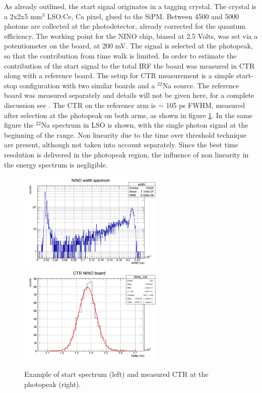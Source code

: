 As already outlined, the start signal originates in a tagging crystal.
The crystal is a 2x2x5 mm$^{3}$ LSO:Ce, Ca pixel, glued to the SiPM. Between 4500 and 5000 photons are collected at the photodetector, already corrected for the quantum efficiency. 
The working point for the NINO chip, biased at 2.5 Volts, was set via a potentiometer on the board, at 200 mV.
The signal is selected at the photopeak, so that the contribution from time walk is limited.
In order to estimate the contribution of the start signal to the total IRF the board was measured in CTR along with a reference board.
The setup for CTR measurement is a simple start-stop configuration with two similar boards and a $^{22}$Na source.
The reference board was measured separately and details will not be given here, for a complete discussion see \cite{Gundacker2014}. The CTR on the reference arm is $\sim$ 105 ps FWHM, measured after selection at the photopeak on both arms, as shown in figure \ref{fig:start}.
In the same figure the $^{22}$Na spectrum in LSO is shown, with the single photon signal at the beginning of the range. Non linearity due to the time over threshold technique are present, although not taken into account separately. Since the best time resolution is delivered in the photopeak region, the influence of non linearity in the energy spectrum is negligible. 
\begin{figure}[htbp]
\begin{center}
\includegraphics[width=7cm]{../Pictures/Chapter_8/spectrum_NINO.png}
\includegraphics[width=7cm]{../Pictures/Chapter_8/CTR.png}
\end{center}
\caption[Start characteristics]{Example of start spectrum (left) and measured CTR at the photopeak (right).}
\label{fig:start}
\end{figure}

